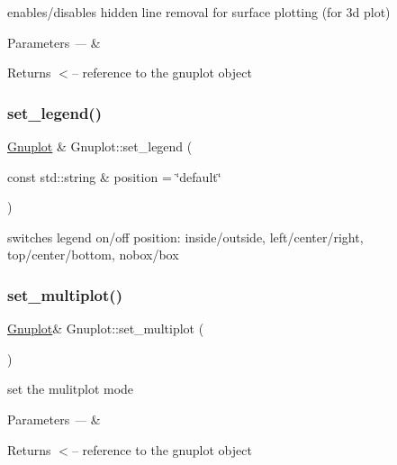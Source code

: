 enables/disables hidden line removal for surface plotting (for 3d plot)


\begin{DoxyParams}{Parameters}
{\em ---} & \\
\hline
\end{DoxyParams}
\begin{DoxyReturn}{Returns}
$<$-- reference to the gnuplot object 
\end{DoxyReturn}
\mbox{\label{class_gnuplot_ad64a717dac18167f656c4f09239973f8}} 
\subsubsection{\texorpdfstring{set\+\_\+legend()}{set\_legend()}}
{\footnotesize\ttfamily \hyperlink{class_gnuplot}{Gnuplot} \& Gnuplot\+::set\+\_\+legend (\begin{DoxyParamCaption}\item[{const std\+::string \&}]{position = {\ttfamily \char`\"{}default\char`\"{}} }\end{DoxyParamCaption})}

switches legend on/off position\+: inside/outside, left/center/right, top/center/bottom, nobox/box \mbox{\label{class_gnuplot_a67efc4d4dc46b6100d14ba2f7366ef11}} 
\subsubsection{\texorpdfstring{set\+\_\+multiplot()}{set\_multiplot()}}
{\footnotesize\ttfamily \hyperlink{class_gnuplot}{Gnuplot}\& Gnuplot\+::set\+\_\+multiplot (\begin{DoxyParamCaption}{ }\end{DoxyParamCaption})\hspace{0.3cm}{\ttfamily [inline]}}

set the mulitplot mode


\begin{DoxyParams}{Parameters}
{\em ---} & \\
\hline
\end{DoxyParams}
\begin{DoxyReturn}{Returns}
$<$-- reference to the gnuplot object 
\end{DoxyReturn}
\mbox{\label{class_gnuplot_aa18386919da2ec4c994f1f9c7195d384}} 
